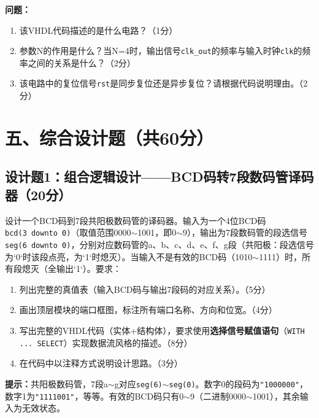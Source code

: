 \begin{framed}
\textbf{问题：}
\begin{enumerate}[label=(\arabic*)]
  \item 该VHDL代码描述的是什么电路？（1分）
  \item 参数N的作用是什么？当N=4时，输出信号\texttt{clk\_out}的频率与输入时钟\texttt{clk}的频率之间的关系是什么？（2分）
  \item 该电路中的复位信号\texttt{rst}是同步复位还是异步复位？请根据代码说明理由。（2分）
\end{enumerate}
\end{framed}

\newpage

\section*{五、综合设计题（共60分）}

\subsection*{设计题1：组合逻辑设计——BCD码转7段数码管译码器（20分）}

设计一个BCD码到7段共阳极数码管的译码器。输入为一个4位BCD码\texttt{bcd(3~downto~0)}（取值范围0000$\sim$1001，即0$\sim$9），输出为7段数码管的段选信号\texttt{seg(6~downto~0)}，分别对应数码管的a、b、c、d、e、f、g段（共阳极：段选信号为`0`时该段点亮，为`1`时熄灭）。当输入不是有效的BCD码（1010$\sim$1111）时，所有段熄灭（全输出`1`）。要求：

\begin{enumerate}[label=(\arabic*)]
  \item 列出完整的真值表（输入BCD码与输出7段码的对应关系）。（5分）
  \item 画出顶层模块的端口框图，标注所有端口名称、方向和位宽。（4分）
  \item 写出完整的VHDL代码（实体+结构体），要求使用\textbf{选择信号赋值语句}（\texttt{WITH ... SELECT}）实现数据流风格的描述。（8分）
  \item 在代码中以注释方式说明设计思路。（3分）
\end{enumerate}

\begin{framed}
\textbf{提示：}共阳极数码管，7段a$\sim$g对应\texttt{seg(6)}$\sim$\texttt{seg(0)}。数字0的段码为\texttt{"1000000"}，数字1为\texttt{"1111001"}，等等。有效的BCD码只有0$\sim$9（二进制0000$\sim$1001），其余输入为无效状态。
\end{framed}

